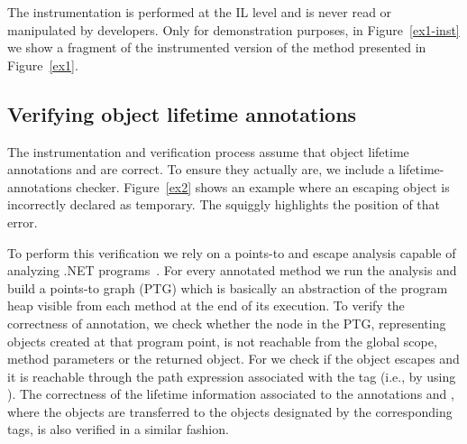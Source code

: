 
The instrumentation is performed at the IL level and is never read or manipulated by developers.
Only for demonstration purposes, in Figure~\ref{ex1-inst} we show a fragment of the instrumented version of the  method presented in Figure~\ref{ex1}.


\subsection{Verifying object lifetime annotations}
The instrumentation and verification process assume that object lifetime annotations  and  are correct. To ensure they actually are, we include a lifetime-annotations checker. 
Figure~\ref{ex2} shows an example where an escaping object is incorrectly declared as temporary. The squiggly highlights the position of that error.



To perform this verification we rely on a points-to and escape analysis capable of analyzing .NET programs~\cite{garber07iwaco}.  For every annotated method we run the analysis and build a points-to graph (PTG) which is basically an abstraction of the program heap visible from each method at the end of its  execution. To verify the correctness of  annotation, we check whether the node in the PTG, representing objects created at that program point, is not reachable from the global scope, method parameters or the returned object.  For  we check if the object escapes and it is reachable through the path expression associated with the tag (i.e.,  by using ).
The correctness of the lifetime information associated to the annotations  and , where the objects are transferred to the objects designated by the corresponding tags, is also verified in a similar fashion.

